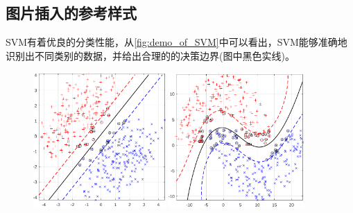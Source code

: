 \documentclass[twoside,zihao=-4,UTF8]{bjfu}
\begin{document}
\subsection{图片插入的参考样式}
SVM有着优良的分类性能，从\autoref{fig:demo_of_SVM}中可以看出，SVM能够准确地识别出不同类别的数据，并给出合理的的决策边界(图中黑色实线)。
\begin{figure}[h]
	\center
	{
		\includegraphics[width=0.45\textwidth]{figs/demo_of_linear_SVM_cropped.pdf}
	}
	{
		\includegraphics[width=0.458\textwidth]{figs/demo_of_kernel_SVM_cropped.pdf}
	} 
	\label{fig:demo_of_SVM}       %
\end{figure}
\end{document}
